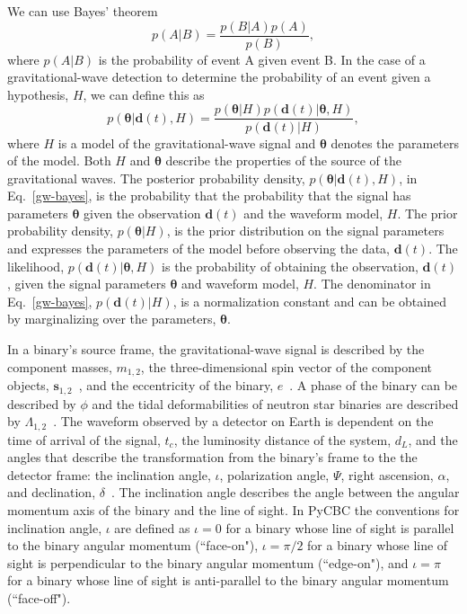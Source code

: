 We can use Bayes' theorem
\begin{equation}\label{bayes}
    p(A|B) = \frac{p(B|A) p(A)}{p(B)},
\end{equation}
where $p(A|B)$ is the probability of event A given event B. In the case of a gravitational-wave detection to determine the probability of an event given a hypothesis, $H$, we can define this as
\begin{equation}\label{gw-bayes}
    p(\boldsymbol{\theta}|\boldsymbol{d}(t),H) = \frac{p(\boldsymbol{\theta}|H) p(\boldsymbol{d}(t)|\boldsymbol{\theta},H)}{p(\boldsymbol{d}(t)|H)},
\end{equation}
where $H$ is a model of the gravitational-wave signal and $\boldsymbol{\theta}$ denotes the parameters of the model. Both $H$ and $\boldsymbol{\theta}$ describe the properties of the source of the gravitational waves. The posterior probability density, $p(\boldsymbol{\theta}|\boldsymbol{d}(t),H)$, in Eq.~\ref{gw-bayes}, is the probability that the probability that the signal has parameters $\boldsymbol{\theta}$ given the observation $\boldsymbol{d}(t)$ and the waveform model, $H$. The prior probability density, $p(\boldsymbol{\theta}|H)$, is the prior distribution on the signal parameters and expresses the parameters of the model before observing the data, $\boldsymbol{d}(t)$. The likelihood,  $p(\boldsymbol{d}(t)|\boldsymbol{\theta},H)$ is the probability of obtaining the observation, $\boldsymbol{d}(t)$, given the signal parameters $\boldsymbol{\theta}$ and waveform model, $H$. The denominator in Eq.~\ref{gw-bayes}, $p(\boldsymbol{d}(t)|H)$, is a normalization constant and can be obtained by marginalizing over the parameters, $\boldsymbol{\theta}$.

In a binary's source frame, the gravitational-wave signal is described by the component masses, $m_{1,2}$, the three-dimensional spin vector of the component objects, $\boldsymbol{s}_{1,2}$~\cite{thorne.k:1987}, and the eccentricity of the binary, $e$~\cite{Peters:1964zz}. A phase of the binary can be described by $\phi$ and the tidal deformabilities of neutron star binaries are described by $\Lambda_{1,2}$~\cite{Flanagan:2007ix,Hinderer:2009ca}. The waveform observed by a detector on Earth is dependent on the time of arrival of the signal, $t_c$, the luminosity distance of the system, $d_L$, and the angles that describe the transformation from the binary's frame to the the detector frame: the inclination angle, $\iota$, polarization angle, $\Psi$, right ascension, $\alpha$, and declination, $\delta$~\cite{Wahlquist:1987rx}. The inclination angle describes the angle between the angular momentum axis of the binary and the line of sight. In PyCBC the conventions for inclination angle, $\iota$ are defined as $\iota = 0$ for a binary whose line of sight is parallel to the binary angular momentum (``face-on"), $\iota = \pi/2$ for a binary whose line of sight is perpendicular to the binary angular momentum (``edge-on"), and $\iota = \pi$ for a binary whose line of sight is anti-parallel to the binary angular momentum (``face-off").

